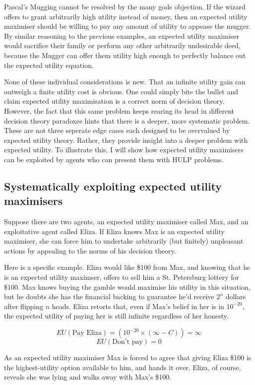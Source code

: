 \documentclass{article}
\begin{document}
Pascal's Mugging cannot be resolved by the many gods objection. If the wizard offers to grant arbitrarily high utility instead of money, then an expected utility maximiser should be willing to pay any amount of utility to appease the mugger. By similar reasoning to the previous examples, an expected utility maximiser would sacrifice their family or perform any other arbitrarily undesirable deed, because the Mugger can offer them utility high enough to perfectly balance out the expected utility equation.

None of these individual considerations is new. That an infinite utility gain can outweigh a finite utility cost is obvious. One could simply bite the bullet and claim expected utility maximisation is a correct norm of decision theory. However, the fact that this same problem keeps rearing its head in different decision theory paradoxes hints that there is a deeper, more systematic problem. These are not three seperate edge cases each designed to be overvalued by expected utility theory. Rather, they provide insight into a deeper problem with expected utility. To illustrate this, I will show how expected utility maximisers can be exploited by agents who can present them with HULP problems.

\subsection{Systematically exploiting expected utility maximisers}

Suppose there are two agents, an expected utility maximiser called Max, and an exploitative agent called Eliza. If Eliza knows Max is an expected utility maximiser, she can force him to undertake arbitrarily (but finitely) unpleasant actions by appealing to the norms of his decision theory. 

Here is a specific example. Eliza would like \$100 from Max, and knowing that he is an expected utility maximser, offers to sell him a St. Petersburg lottery for \$100. Max knows buying the gamble would maximise his utility in this situation, but he doubts she has the financial backing to guarantee he'd receive \(2^n\) dollars after flipping \(n\) heads. Eliza retorts that, even if Max's belief in her is in \(10^{-20}\), the expected utility of paying her is still infinite regardless of her honesty.

\[EU(\mbox{Pay Eliza})=(10^{-20}\times(\infty-C)) = \infty\]
\[EU(\mbox{Don't pay})=0\]

As an expected utility maximiser Max is forced to agree that giving Eliza \$100 is the highest-utility option available to him, and hands it over. Eliza, of course, reveals she was lying and walks away with Max's \$100.
\end{document}
